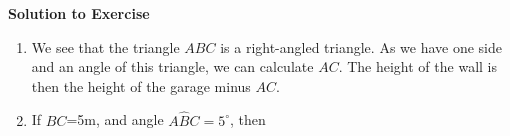 {\begin{mdframed}[linewidth=4, leftmargin=40, rightmargin=40]
\begin{exercise}
\begin{figure}[H]
\begin{center}
      \vspace{2pt}
    \vspace{.1in}
    
    \end{center}

 \end{figure}   

    \addtocounter{footnote}{-0}
    
        \par 
        
        \vspace{5pt}
        \label{m39411*solfhsst!!!underscore!!!id1758}\noindent\textbf{Solution to Exercise } \label{m39411*listfhsst!!!underscore!!!id1758}\begin{enumerate}[noitemsep, label=\textbf{Step} \textbf{\arabic*}. ] 
            \leftskip=20pt\rightskip=\leftskip\item  
        \label{m39411*id83116}We see that the triangle \begin{math}ABC\end{math} is a right-angled triangle. As we have one side and an angle of this triangle, we can calculate \begin{math}AC\end{math}. The height of the wall is then the height of the garage minus \begin{math}AC\end{math}.\par 
        \item  
        \label{m39411*id83164}If \begin{math}BC\end{math}=5m, and angle \begin{math}A\hat{B}C={5}^{\circ }\end{math}, then\par 
        \label{m39411*id83209}\nopagebreak\noindent{}

\end{enumerate}
\end{exercise}
\end{mdframed}}

